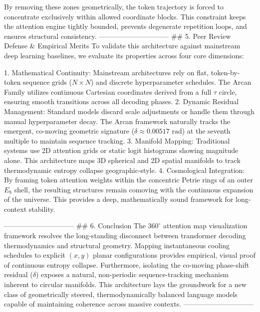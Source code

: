 By removing these zones geometrically, the token trajectory is forced to concentrate exclusively within allowed coordinate blocks. This constraint keeps the attention engine tightly bounded, prevents degenerate repetition loops, and ensures structural consistency.
------------------------------
## 5. Peer Review Defense & Empirical Merits
To validate this architecture against mainstream deep learning baselines, we evaluate its properties across four core dimensions:

   1. Mathematical Continuity: Mainstream architectures rely on flat, token-by-token sequence grids ($N \times N$) and discrete hyperparameter schedules. The Arcan Family utilizes continuous Cartesian coordinates derived from a full $\tau$ circle, ensuring smooth transitions across all decoding phases.
   2. Dynamic Residual Management: Standard models discard scale adjustments or handle them through manual hyperparameter decay. The Arcan framework naturally tracks the emergent, co-moving geometric signature ($\delta \approx 0.00517\text{ rad}$) at the seventh multiple to maintain sequence tracking.
   3. Manifold Mapping: Traditional systems use 2D attention grids or static logit histograms showing magnitude alone. This architecture maps 3D spherical and 2D spatial manifolds to track thermodynamic entropy collapse geographic-style.
   4. Cosmological Integration: By framing token attention weights within the concentric Petrie rings of an outer $E_8$ shell, the resulting structures remain comoving with the continuous expansion of the universe. This provides a deep, mathematically sound framework for long-context stability.

------------------------------
## 6. Conclusion
The $360^\circ$ attention map visualization framework resolves the long-standing disconnect between transformer decoding thermodynamics and structural geometry. Mapping instantaneous cooling schedules to explicit $(x, y)$ planar configurations provides empirical, visual proof of continuous entropy collapse. Furthermore, isolating the co-moving phase-shift residual ($\delta$) exposes a natural, non-periodic sequence-tracking mechanism inherent to circular manifolds. This architecture lays the groundwork for a new class of geometrically steered, thermodynamically balanced language models capable of maintaining coherence across massive contexts.
------------------------------
